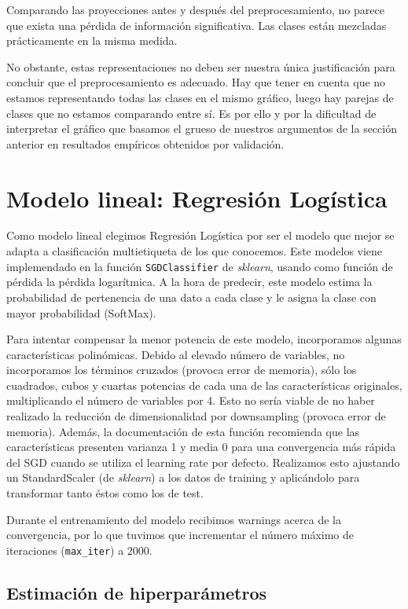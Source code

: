 \documentclass[a4]{article}
\begin{document}
Comparando las proyecciones antes y después del preprocesamiento, no
parece que exista una pérdida de información significativa. Las
clases están mezcladas prácticamente en la misma medida.

No obstante, estas representaciones no deben ser nuestra única
justificación para concluir que el preprocesamiento es adecuado. Hay
que tener en cuenta que no estamos representando todas las clases en
el mismo gráfico, luego hay parejas de clases que no estamos
comparando entre sí. Es por ello y por la dificultad de interpretar el gráfico que basamos el grueso de nuestros argumentos de la sección
anterior en resultados empíricos obtenidos por validación.

\section{Modelo lineal: Regresión Logística}

Como modelo lineal elegimos Regresión Logística por ser el modelo que
mejor se adapta a clasificación multietiqueta de los que
conocemos. Este modelos viene implemendado en la función
\texttt{SGDClassifier} de \textit{sklearn}, usando como función de
pérdida la pérdida logarítmica. A la hora de predecir, este modelo
estima la probabilidad de pertenencia de una dato a cada clase y le
asigna la clase con mayor probabilidad (SoftMax).

Para intentar compensar la menor potencia de este modelo, incorporamos
algunas características polinómicas. Debido al elevado número de
variables, no incorporamos los términos cruzados (provoca error de
memoria), sólo los cuadrados, cubos y cuartas potencias de cada una de
las características originales, multiplicando el número de variables
por 4. Esto no sería viable de no haber realizado la reducción de
dimensionalidad por downsampling (provoca error de memoria). Además,
la documentación de esta función recomienda que las características
presenten varianza 1 y media 0 para una convergencia más rápida del
SGD cuando se utiliza el learning rate por defecto. Realizamos esto ajustando un StandardScaler (de \textit{sklearn})
a los datos de training y aplicándolo para transformar tanto éstos
como los de test.

Durante el entrenamiento del modelo recibimos warnings acerca de la convergencia, por lo que tuvimos que incrementar el número máximo de iteraciones (\texttt{max\_iter}) a $2000$. 

\subsection{Estimación de hiperparámetros}
\end{document}
